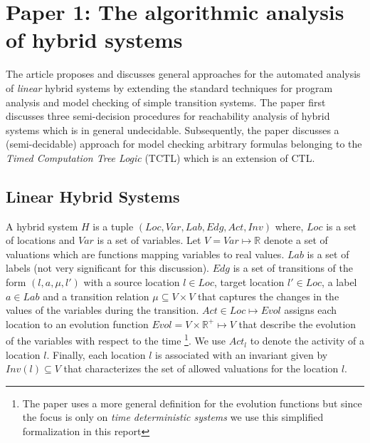 \newcommand{\real}{\mathbb{R}}
\newcommand{\loc}{\mathit{Loc}}
\newcommand{\var}{\mathit{Var}}
\newcommand{\lab}{\mathit{Lab}}
\newcommand{\edg}{\mathit{Edg}}
\newcommand{\act}{\mathit{Act}}
\newcommand{\evol}{\mathit{Evol}}
\newcommand{\invr}{\mathit{Inv}}
\newcommand{\trans}{\mathit{(l,a,\mu,l')}}
\newcommand{\reach}{\mapsto^*}
\newcommand{\ftclosure}[2]{\langle #1 \rangle^{\nearrow}_{#2}}
\newcommand{\btclosure}[2]{\langle #1 \rangle^{\swarrow}_{#2}}

\section{Paper 1: The algorithmic analysis of hybrid systems \cite{Alur:95}} \label{sec:paper1}

The article proposes and discusses general approaches for the automated analysis of \emph{linear} hybrid systems by extending the standard techniques for program analysis and model checking of simple transition systems. The paper first discusses three semi-decision procedures for reachability analysis of hybrid systems which is in general undecidable. Subsequently, the paper discusses a (semi-decidable) approach  for model checking arbitrary formulas belonging to the \emph{Timed Computation Tree Logic} (TCTL) which is an extension of CTL.

\subsection{\textbf{Linear Hybrid Systems}} 

A hybrid system $H$ is a tuple $(\loc,\var,\lab,\edg,\act,\invr)$ where,
$\loc$ is a set of locations and $\var$ is a set of variables. 
Let $V= \var \mapsto \real$ denote a set of valuations which are functions mapping variables to real values.
$\lab$ is a set of labels (not very significant for this discussion). $\edg$ is a set of transitions of the form $\trans$ with a source location $l \in \loc$, target location $l' \in \loc$, a label $a \in \lab$ and a transition relation $\mu \subseteq V \times V$ that captures the changes in the values of the variables during the transition. 
$\act \in \loc \mapsto \evol$ assigns each location to an evolution function $\evol = V \times \real^+ \mapsto V$ that describe the evolution of the variables with respect to the time
\footnote{The paper uses a more general definition for the evolution functions but since the focus is only on \emph{time deterministic systems} we use this simplified formalization in this report}. 
We use $\act_l$ to denote the activity of a location $l$.
Finally, each location $l$ is associated with an invariant given by $\invr(l) \subseteq V$ that characterizes the set of allowed valuations for the location $l$.

